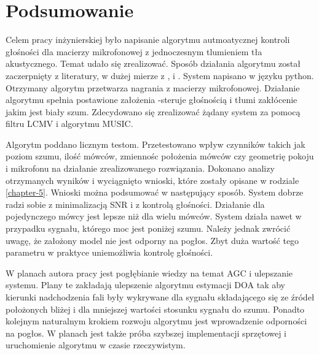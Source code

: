 \chapter{Podsumowanie}
\label{chapter-6}

Celem pracy inżynierskiej było napisanie algorytmu autmoatycznej kontroli głośności dla macierzy mikrofonowej z jednoczesnym tlumieniem tła akustycznego. Temat udało się zrealizować. Sposób działania algorytmu został zaczerpnięty z literatury, w dużej mierze z \cite{Braun2014}, \cite{Thiergart2013} i  \cite{Schmidt1986}. System napisano w języku python. Otrzymany algorytm przetwarza nagrania z macierzy mikrofonowej. Działanie algorytmu spełnia postawione założenia -steruje głośnością i tłumi zakłócenie jakim jest biały szum. Zdecydowano się zrealizować żądany system za pomocą filtru LCMV i algorytmu MUSIC.

Algorytm poddano licznym testom. Przetestowano wpływ czynników takich jak poziom szumu, ilość mówców, zmiennośc położenia mówców czy geometrię pokoju i mikrofonu na działanie zrealizowanego rozwiązania. Dokonano analizy otrzymanych wyników i wyciągnięto wnioski, które zostały opisane w rodziale \ref{chapter-5}. Wnioski można podsumować w następujący sposób. System dobrze radzi sobie z minimalizacją SNR i z kontrolą głośności. Działanie dla pojedynczego mówcy jest lepsze niż dla wielu mówców. System działa nawet w przypadku sygnału, którego moc jest poniżej szumu. Należy jednak zwrócić uwagę, że założony model nie jest odporny na pogłos. Zbyt duża wartość tego parametru w praktyce uniemożliwia kontrolę głośności.

W planach autora pracy jest pogłębianie wiedzy na temat AGC i ulepszanie systemu. Plany te zakładają ulepszenie algorytmu estymacji DOA tak aby kierunki nadchodzenia fali były wykrywane dla sygnału składającego się ze źródeł położonych bliżej i dla mniejszej wartości stosunku sygnału do szumu. Ponadto kolejnym naturalnym krokiem rozwoju algorytmu jest wprowadzenie odporności na pogłos. W planach jest także próba szybszej implementacji sprzętowej i uruchomienie algorytmu w czasie rzeczywistym.